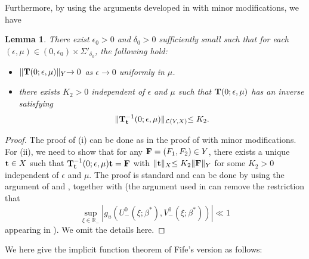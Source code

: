 \documentclass[11pt,a4paper]{article}
\newtheorem{lemma}[theorem]{\textbf{Lemma}}
\numberwithin{equation}{section}
\numberwithin{figure}{section}
\newcommand\bt{{\bf t}}
\newcommand\bT{{\bf T}}
\newcommand\ep{\epsilon}
\newcommand\beaa{\begin{eqnarray*}}
\newcommand\eeaa{\end{eqnarray*}}
\begin{document}
Furthermore, by using the arguments developed in \cite{Fife1976, Hosono Mimura 1982, Ito1985} with minor modifications, we have

\begin{lemma}\label{lem:For-IFT}
There exist $\ep_0>0$ and $\delta_0>0$ sufficiently small such that
for each $(\ep, \mu)\in (0,\ep_0)\times \Sigma'_{\delta_0}$, the following hold:
\begin{itemize}
  \item[(i)] $\lVert\bT(0;\epsilon,\mu)\lVert_{Y}\to 0$ as $\ep\to0$ uniformly in $\mu$.
  \item[(ii)]  there exists $K_2>0$ independent of $\epsilon$ and $\mu$ such that $\bT(0;\epsilon,\mu)$ has an inverse satisfying
  \beaa
  \lVert\bT_{{\bt}}^{-1}(0;\epsilon,\mu)\lVert_{\mathcal{L}(Y,X)}\leq K_2.
  \eeaa
\end{itemize}
\end{lemma}
\begin{proof}
The proof of (i) can be done as in the proof of \cite[Lemma 5.4 (iii)]{Hosono Mimura 1982} with minor modifications.
For (ii), we need to show that for any ${\bf F}=(F_1,F_2)\in Y$, there exists a unique ${\bf t}\in X$ such that $\bT_{{\bt}}^{-1}(0;\epsilon,\mu){\bf t}={\bf F}$ with $\lVert \bt \lVert_{X}\leq K_2 \lVert {\bf F}\lVert_Y$ for some $K_2>0$ independent  of  $\epsilon$ and $\mu$. The proof is standard and can be done by using the argument of \cite[Lemma 3.2]{Fife1976} and  \cite[Lemma 5.3]{Hosono Mimura 1982}, together with \cite[Lemma 4.3]{Ito1985} (the argument used in \cite[Lemma 4.3]{Ito1985} can remove the restriction that 
$$\sup_{\xi\in \mathbb{R}_-}|g_u(U^0_-(\xi;\beta^*),V^0_-(\xi;\beta^*))|\ll1$$
appearing in \cite{Fife1976, Hosono Mimura 1982}). We omit the details here.
\end{proof}

We here give the implicit function theorem of Fife's version \cite{Fife1976} as follows:
\end{document}
